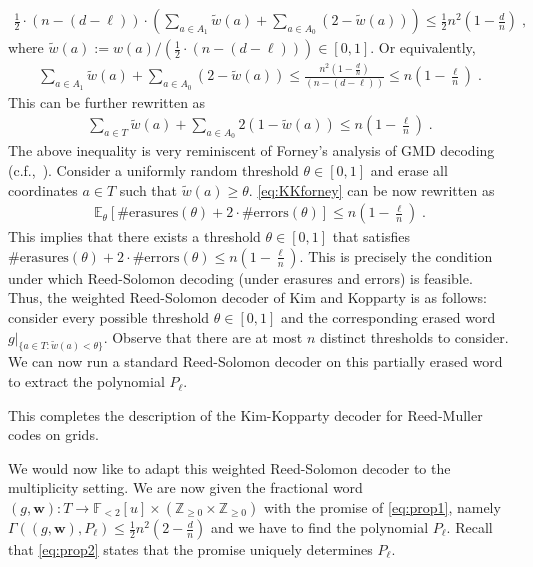 \documentclass{theoretics}
\def\Integer{\mathbb{Z}}
\def\Field{\mathbb{F}}
\let\Z\Integer
\let\F\Field
\def\E{\operatornamewithlimits{\mathbb{E}}}			%
\def\vecw{\mathbf{w}}
\renewcommand{\E}{\mathbb{E}}
\newcommand{\ow}{\widetilde{w}}
\newcommand{\vw}{\vecw}
\begin{document}
	\begin{align*}
		\frac12 \cdot (n-(d-\ell)) \cdot \left( \sum_{a \in A_1} \ow(a) +
		\sum_{a \in A_0} (2-\ow(a))\right) \leq \frac12 n^2\left(1 -
		\frac{d}{n}\right)\;,
	\end{align*}
	where $\ow(a) := w(a)/\left(\frac12 \cdot (n-(d-\ell))\right) \in
	[0,1]$. Or equivalently,
	\begin{align*}
		\sum_{a \in A_1} \ow(a) +
		\sum_{a \in A_0} (2-\ow(a)) \leq \frac{n^2\left(1 -
			\frac{d}{n}\right)}{ (n-(d-\ell))} \leq n \left( 1 -
		\frac{\ell}{n}\right)\; .
	\end{align*}
	This can be further rewritten as
	\begin{align}
		\sum_{a \in T} \ow(a) + \sum_{a \in A_0} 2(1-\ow(a)) \leq n \left( 1 -
		\frac{\ell}{n}\right)\; .\label{eq:KKforney}
	\end{align}  
	The above inequality is very reminiscent of Forney's analysis of GMD
	decoding (c.f.,~\cite[Section~12.3]{GuruswamiRS}). Consider a uniformly random
	threshold $\theta \in [0,1]$ and erase all coordinates $a
	\in T$ such that $\ow(a) \geq \theta$. \eqref{eq:KKforney} can be now
	rewritten as
	\begin{align}
		\E_\theta\left[ \text{\# erasures}(\theta) + 2\cdot \text{\# errors}(\theta)\right]
		\leq n \left( 1 -
		\frac{\ell}{n}\right)\;. \label{eq:Forneyhyp}
	\end{align}
	This implies that there exists a threshold $\theta\in [0,1]$ that
	satisfies
	$\text{\# erasures}(\theta) + 2\cdot \text{\# errors}(\theta) \leq n
	\left( 1 - \frac{\ell}{n}\right)$. This is precisely the condition
	under which Reed-Solomon decoding (under erasures and errors) is
	feasible. Thus, the weighted Reed-Solomon decoder of Kim and Kopparty
	is as follows: consider every possible threshold $\theta \in [0,1]$
	and the corresponding erased word
	$g|_{\{a \in T \colon \ow(a) < \theta\}}$. Observe that there are at most
	$n$ distinct thresholds to consider. We can now run a standard
	Reed-Solomon decoder on this partially erased word to extract the
	polynomial $P_\ell$.
	
	This completes the description of the Kim-Kopparty decoder for Reed-Muller codes on grids.
	
	We would now like to adapt this weighted
	Reed-Solomon decoder to the multiplicity setting. We are now given
	the fractional word $(g,\vw) \colon T \to
	\F_{<2}[u] \times (\Z_{\geq 0} \times \Z_{\geq 0})$ with the promise
	of \eqref{eq:prop1}, namely $\Gamma((g,\vw),P_\ell) \leq
	\frac12 n^2(2-\frac{d}n)$ and we have to find the polynomial $P_\ell$. Recall that \eqref{eq:prop2} states that
	the promise uniquely determines $P_\ell$.
	
\end{document}

